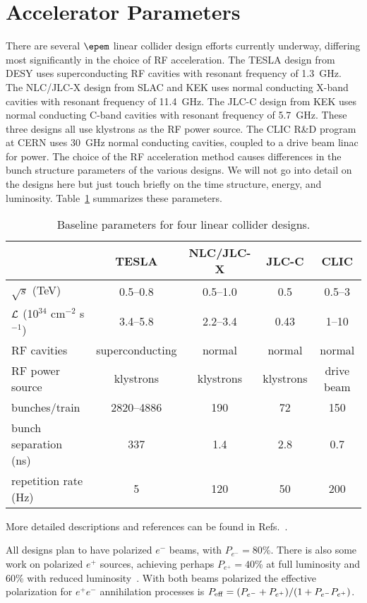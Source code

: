 \section{Accelerator Parameters}

There are several $\epem$ linear collider design efforts currently 
underway, differing most significantly in the choice of RF 
acceleration.
The TESLA design from DESY uses superconducting RF cavities with 
resonant frequency of 1.3~GHz.
The NLC/JLC-X design from SLAC and KEK uses normal conducting X-band
cavities with resonant frequency of 11.4~GHz.
The JLC-C design from KEK uses normal conducting C-band cavities with 
resonant frequency of 5.7~GHz.
These three designs all use klystrons as the RF power source.
The CLIC R\&D program at CERN uses 30~GHz normal conducting 
cavities, coupled to a drive beam linac for power.
The choice of the RF acceleration method causes differences in the 
bunch structure parameters of the various designs.
We will not go into detail on the designs here but just touch briefly 
on the time structure, energy, and luminosity.
Table~\ref{table-lc_params} summarizes these parameters.
%
\begin{table}[t]
\centering
\caption{Baseline parameters for four linear collider designs.}
\label{table-lc_params}
\vskip 6pt
\begin{tabular}{lcccc}
\hline \hline
  & TESLA & NLC/JLC-X & JLC-C & CLIC \\
\hline 
$\sqrt{s}$ (TeV) & 0.5--0.8 & 0.5--1.0 & 0.5 & 0.5--3 \\ 
${\cal L}$ (10$^{34}$ cm$^{-2}$ s$^{-1}$)
	& 3.4--5.8 & 2.2--3.4 & 0.43 & 1--10 \\
RF cavities & superconducting & normal & normal & normal \\
RF power source & klystrons & klystrons & klystrons & drive beam \\
bunches/train & 2820--4886 & 190 & 72 & 150 \\ 
bunch separation (ns) & 337 & 1.4 & 2.8 & 0.7 \\
repetition rate (Hz) & 5  & 120  & 50 & 200  \\ 
\hline \hline
\end{tabular}
\end{table} 
More detailed descriptions and references can be found in
Refs.~\cite{Kuhlman:1996rc,Toge:2000mm,Brinkmann:1999rz,Assmann:2000hg}.

All designs plan to have polarized $e^-$ beams, with $P_{e^-}=80$\%.
There is also some work on polarized $e^+$ sources, achieving perhaps 
$P_{e^+}=40$\% at full luminosity and 60\% with reduced
luminosity~\cite{Walker}.
With both beams polarized the effective polarization for $e^+e^-$ 
annihilation processes is 
$P_{\rm eff}=(P_{e^-}+P_{e^+})/(1 + P_{e^-}P_{e^+})$.

